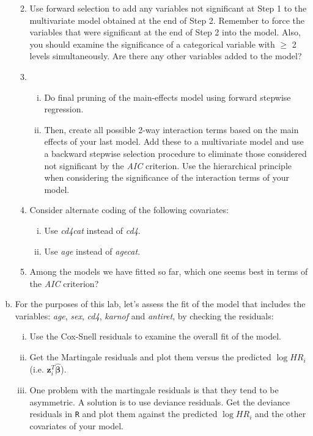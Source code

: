 \begin{enumerate}[(a)]
\begin{enumerate}[Step 1:]
\begin{enumerate}[(i)]
\end{enumerate}
\item Use forward selection to add any variables not significant at Step 1 to the multivariate 
model obtained at the end of Step 2. Remember to force the variables that were significant at the end of Step 2 into the model. Also, you should examine the significance of a categorical variable with $\geq$ 2 levels simultaneously. Are there any other variables added to the model?
\item  
\begin{enumerate}[(i)]
\item Do final pruning of the main-effects model using forward stepwise
regression. 

\item Then, create all possible 2-way interaction terms based on the main effects of your last model. Add these to a multivariate model and use a backward stepwise selection 
procedure to eliminate those considered not significant by the \emph{AIC} criterion. Use the hierarchical principle when considering the significance of the interaction terms of your model.
\end{enumerate}
\item Consider alternate 
coding of the following covariates:
\begin{enumerate}[(i)]
\item Use \emph{cd4cat} instead of \emph{cd4}.
\item Use \emph{age} instead of \emph{agecat}.
\end{enumerate}
\item Among the models we have fitted so far, which one seems best in terms of the \emph{AIC} criterion?
\end{enumerate}
\item For the purposes of this lab, let's assess the fit of the model that includes the variables: \emph{age}, \emph{sex}, \emph{cd4}, \emph{karnof} and \emph{antiret}, by checking the residuals:
\begin{enumerate}[(i)]
\item Use the Cox-Snell residuals to examine the overall fit of the model.
\item Get the Martingale residuals and plot them versus the predicted $\log HR_{i}$ (i.e. $\mathbf{z}_{i}^{T}\hat{\boldsymbol{\beta}}$).
\item One problem with the martingale residuals
is that they tend to be asymmetric.
A solution is to use deviance residuals. Get the deviance residuals in \verb|R| and plot them against the predicted $\log HR_{i}$ and the other covariates of your model.

\end{enumerate}
\end{enumerate}
